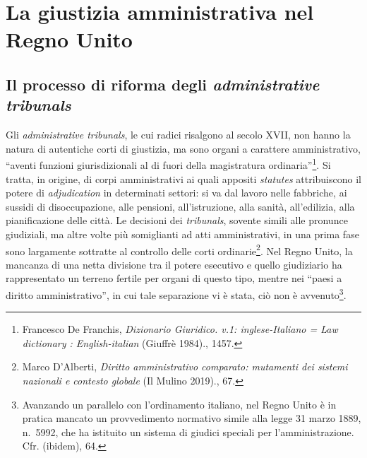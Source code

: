 \documentclass[12pt,it,a4paper,]{report}
\begin{document}
\hypertarget{la-giustizia-amministrativa-nel-regno-unito}{%
\chapter{La giustizia amministrativa nel Regno
Unito}\label{la-giustizia-amministrativa-nel-regno-unito}}

\hypertarget{il-processo-di-riforma-degli-administrative-tribunals}{%
\section{\texorpdfstring{Il processo di riforma degli
\emph{administrative
tribunals}}{Il processo di riforma degli administrative tribunals}}\label{il-processo-di-riforma-degli-administrative-tribunals}}

Gli \emph{administrative tribunals}, le cui radici risalgono al secolo
XVII, non hanno la natura di autentiche corti di giustizia, ma sono
organi a carattere amministrativo, ``aventi funzioni giurisdizionali al
di fuori della magistratura ordinaria''\footnote{{Francesco De Franchis,
  \emph{Dizionario Giuridico. v.1: inglese-Italiano = Law dictionary :
  English-italian} (Giuffrè 1984).}, 1457.}. Si tratta, in origine, di
corpi amministrativi ai quali appositi \emph{statutes} attribuiscono il
potere di \emph{adjudication} in determinati settori: si va dal lavoro
nelle fabbriche, ai sussidi di disoccupazione, alle pensioni,
all'istruzione, alla sanità, all'edilizia, alla pianificazione delle
città. Le decisioni dei \emph{tribunals}, sovente simili alle pronunce
giudiziali, ma altre volte più somiglianti ad atti amministrativi, in
una prima fase sono largamente sottratte al controllo delle corti
ordinarie\footnote{{Marco D'Alberti, \emph{Diritto amministrativo
  comparato: mutamenti dei sistemi nazionali e contesto globale} (Il
  Mulino 2019).}, 67.}. Nel Regno Unito, la mancanza di una netta
divisione tra il potere esecutivo e quello giudiziario ha rappresentato
un terreno fertile per organi di questo tipo, mentre nei ``paesi a
diritto amministrativo'', in cui tale separazione vi è stata, ciò non è
avvenuto\footnote{Avanzando un parallelo con l'ordinamento italiano, nel
  Regno Unito è in pratica mancato un provvedimento normativo simile
  alla legge 31 marzo 1889, n.~5992, che ha istituito un sistema di
  giudici speciali per l'amministrazione. Cfr. (ibidem), 64.}.
\end{document}

